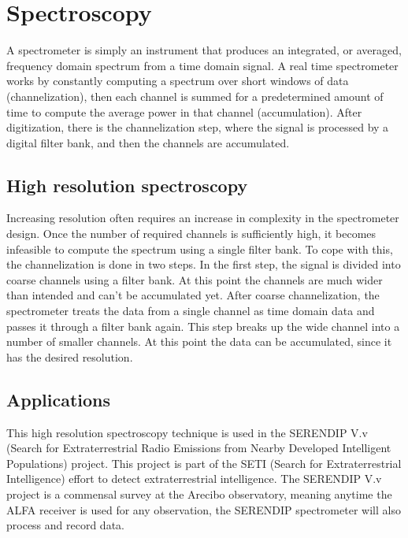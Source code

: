 \section{Spectroscopy}
\label{Real Time Radio Astronomy Algorithms:Spectroscopy}
A spectrometer is simply an instrument that produces an integrated, or averaged, frequency domain spectrum from a time domain signal. 
A real time spectrometer works by constantly computing a spectrum over short windows of data (channelization), then each channel is summed for a predetermined amount of time to compute the average power in that channel (accumulation). 
After digitization, there is the channelization step, where the signal is processed by a digital filter bank, and then the channels are accumulated. 

\subsection{High resolution spectroscopy}
Increasing resolution often requires an increase in complexity in the spectrometer design. 
Once the number of required channels is sufficiently high, it becomes infeasible to compute the spectrum using a single filter bank. 
To cope with this, the channelization is done in two steps. %
In the first step, the signal is divided into coarse channels using a filter bank. 
At this point the channels are much wider than intended and can't be accumulated yet. 
After coarse channelization, the spectrometer treats the data from a single channel as time domain data and passes it through a filter bank again. 
This step breaks up the wide channel into a number of smaller channels. 
At this point the data can be accumulated, since it has the desired resolution.

\subsection{Applications}

This high resolution spectroscopy technique is used in the SERENDIP V.v (Search for Extraterrestrial Radio Emissions from Nearby Developed Intelligent Populations) project. 
This project is part of the SETI (Search for Extraterrestrial Intelligence) effort to detect extraterrestrial intelligence. 
The SERENDIP V.v project is a commensal survey at the Arecibo observatory, meaning anytime the ALFA receiver is used for any observation, the SERENDIP spectrometer will also process and record data. %

